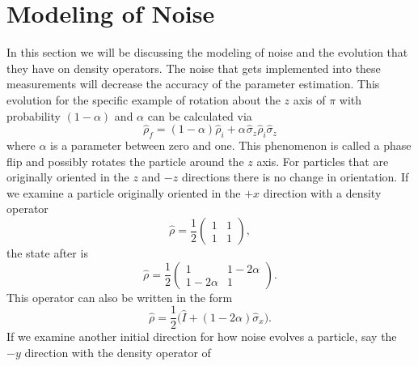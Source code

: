 \documentclass[twocolumn]{article}
\begin{document}
\section*{Modeling of Noise}
In this section we will be discussing the modeling of noise and the evolution that they have on density operators. The noise that gets implemented into these measurements will decrease the accuracy of the parameter estimation. This evolution for the specific example of rotation about the $z$ axis of $\pi$ with probability $(1-\alpha)$ and $\alpha$ can be calculated via
\begin{equation} \label{eq:86}
\hat{\rho}_f=(1-\alpha)\hat{\rho}_i+\alpha\hspace{1pt}\hat{\sigma}_z\hat{\rho}_i\hat{\sigma}_z
\end{equation}
where $\alpha$ is a parameter between zero and one. This phenomenon is called a phase flip and possibly rotates the particle around the $z$ axis. For particles that are originally oriented in the $z$ and $-z$ directions there is no change in orientation. If we examine a particle originally oriented in the $+x$ direction with a density operator 
\begin{equation} \label{eq:87}
\hat{\rho}=\frac{1}{2}
\begin{pmatrix}
1 & 1 \\
1 & 1
\end{pmatrix},
\end{equation}
the state after is
\begin{equation} \label{eq:88}
\hat{\rho}=\frac{1}{2}
\begin{pmatrix}
1 & 1-2\alpha \\
1-2\alpha & 1
\end{pmatrix}.
\end{equation}
This operator can also be written in the form
\begin{equation} \label{eq:89}
\hat{\rho}=\frac{1}{2}\big(\hat{I}+(1-2\alpha)\hat{\sigma}_x\big).
\end{equation}
If we examine another initial direction for how noise evolves a particle, say the $-y$ direction with the density operator of 
\end{document}

